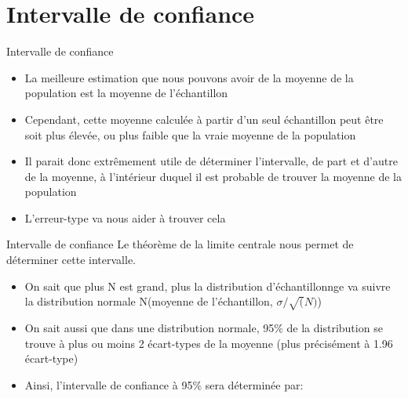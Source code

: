 \documentclass[
  ignorenonframetext,
]{beamer}
\providecommand{\tightlist}{%
  \setlength{\itemsep}{0pt}\setlength{\parskip}{0pt}}
\begin{document}
\hypertarget{intervalle-de-confiance}{%
\section{Intervalle de confiance}\label{intervalle-de-confiance}}

\begin{frame}{Intervalle de confiance}
\protect\hypertarget{intervalle-de-confiance-1}{}
\begin{itemize}
\tightlist
\item
  La meilleure estimation que nous pouvons avoir de la moyenne de la
  population est la moyenne de l'échantillon
\end{itemize}

\begin{itemize}[<+->]
\tightlist
\item
  Cependant, cette moyenne calculée à partir d'un seul échantillon peut
  être soit plus élevée, ou plus faible que la vraie moyenne de la
  population
\end{itemize}

\begin{itemize}[<+->]
\tightlist
\item
  Il parait donc extrêmement utile de déterminer l'intervalle, de part
  et d'autre de la moyenne, à l'intérieur duquel il est probable de
  trouver la moyenne de la population
\end{itemize}

\begin{itemize}[<+->]
\tightlist
\item
  L'erreur-type va nous aider à trouver cela
\end{itemize}
\end{frame}

\begin{frame}{Intervalle de confiance}
\protect\hypertarget{intervalle-de-confiance-2}{}
Le théorème de la limite centrale nous permet de déterminer cette
intervalle.

\begin{itemize}[<+->]
\tightlist
\item
  On sait que plus N est grand, plus la distribution d'échantillonnge va
  suivre la distribution normale N(moyenne de l'échantillon,
  \(\sigma/\sqrt(N)\))
\end{itemize}

\begin{itemize}[<+->]
\tightlist
\item
  On sait aussi que dans une distribution normale, 95\% de la
  distribution se trouve à plus ou moins 2 écart-types de la moyenne
  (plus précisément à 1.96 écart-type)
\end{itemize}

\begin{itemize}[<+->]
\tightlist
\item
  Ainsi, l'intervalle de confiance à 95\% sera déterminée par:
\end{itemize}
\end{frame}
\end{document}
